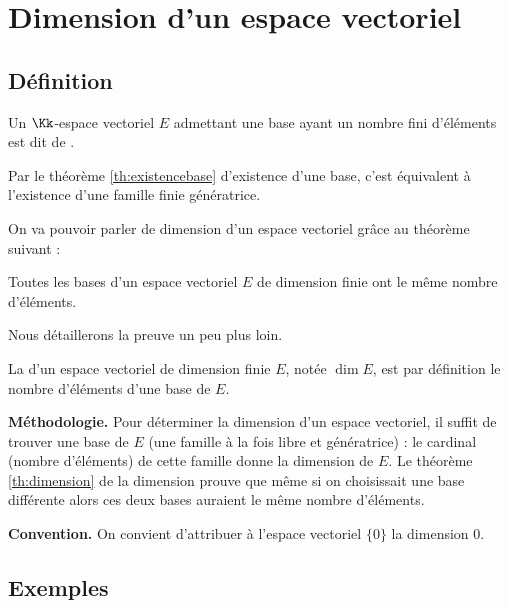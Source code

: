 \documentclass[class=report,crop=false]{standalone}
\begin{document}
\section{Dimension d'un espace vectoriel}

\subsection{Définition}

\begin{definition}
Un $\Kk$-espace vectoriel $E$ admettant une base ayant un nombre fini
d'éléments est dit de .
\end{definition}
Par le théorème \ref{th:existencebase} d'existence d'une base, c'est équivalent à l'existence d'une
famille finie génératrice.


On va pouvoir parler de  dimension d'un espace vectoriel grâce au théorème suivant :
\begin{theoreme}
\label{th:dimension}
Toutes les bases d'un espace vectoriel $E$ de dimension
finie ont le même nombre d'éléments.
\end{theoreme}

Nous détaillerons la preuve un peu plus loin.

\begin{definition}
La  d'un espace vectoriel de dimension finie $E$,
notée $\dim E$, est par définition le nombre d'éléments d'une base de $E$.
\end{definition}

\textbf{Méthodologie.}
 Pour déterminer la dimension d'un espace vectoriel, il suffit de trouver une base de $E$
(une famille à la fois libre et génératrice) : le cardinal (nombre d'éléments) de cette famille donne la dimension de $E$.
Le théorème \ref{th:dimension} de la dimension prouve que même si on choisissait
une base différente alors ces deux bases auraient le même nombre d'éléments.

\textbf{Convention.} On convient d'attribuer à l'espace vectoriel $\{0\}$ la dimension $0$.


\subsection{Exemples}
\end{document}
